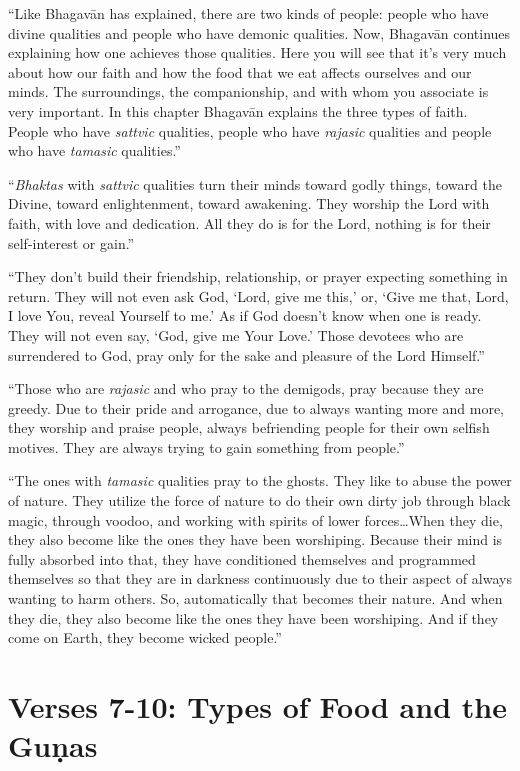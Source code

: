 \enquote{Like Bhagavān has explained, there are two kinds of people: people who have divine qualities and people who have demonic qualities. Now, Bhagavān continues explaining how one achieves those qualities. Here you will see that it’s very much about how our faith and how the food that we eat affects ourselves and our minds. The surroundings, the companionship, and with whom you associate is very important. In this chapter Bhagavān explains the three types of faith. People who have \textit{sattvic} qualities, people who have \textit{rajasic} qualities and people who have \textit{tamasic} qualities.}

\enquote{\textit{Bhaktas} with \textit{sattvic} qualities turn their minds toward godly things, toward the Divine, toward enlightenment, toward awakening. They worship the Lord with faith, with love and dedication. All they do is for the Lord, nothing is for their self-interest or gain.}

\enquote{They don’t build their friendship, relationship, or prayer expecting something in return. They will not even ask God, \enquote{Lord, give me this,} or, \enquote{Give me that, Lord, I love You, reveal Yourself to me.} As if God doesn’t know when one is ready. They will not even say, \enquote{God, give me Your Love.} Those devotees who are surrendered to God, pray only for the sake and pleasure of the Lord Himself.}

\enquote{Those who are \textit{rajasic} and who pray to the demigods, pray because they are greedy. Due to their pride and arrogance, due to always wanting more and more, they worship and praise people, always befriending people for their own selfish motives. They are always trying to gain something from people.}

\enquote{The ones with \textit{tamasic} qualities pray to the ghosts. They like to abuse the power of nature. They utilize the force of nature to do their own dirty job through black magic, through voodoo, and working with spirits of lower forces\ldots When they die, they also become like the ones they have been worshiping. Because their mind is fully absorbed into that, they have conditioned themselves and programmed themselves so that they are in darkness continuously due to their aspect of always wanting to harm others. So, automatically that becomes their nature. And when they die, they also become like the ones they have been worshiping. And if they come on Earth, they become wicked people.}

\section{Verses 7-10: Types of Food and the Guṇas}\label{sec-verses-7-10-types-of-food-and-the-gunas}


